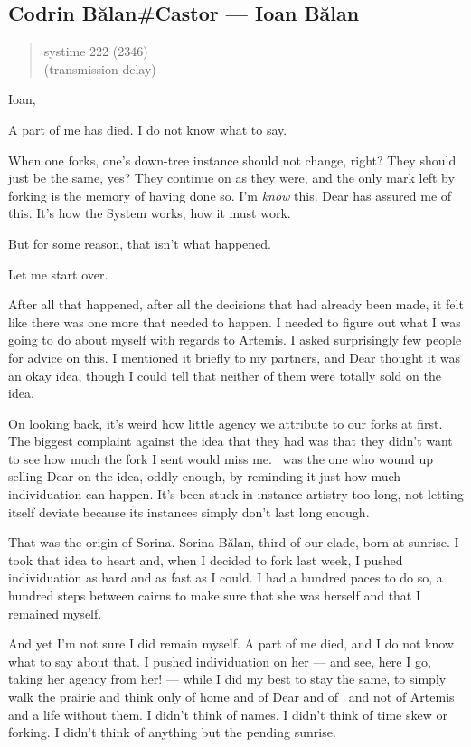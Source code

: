 \hypertarget{codrin-bux103lancastor-ioan-bux103lan}{%
\subsection{Codrin Bălan\#Castor — Ioan Bălan}\label{codrin-bux103lancastor-ioan-bux103lan}}

\begin{quote}
systime 222 (2346)\\
(transmission delay)
\end{quote}

Ioan,

A part of me has died. I do not know what to say.

When one forks, one's down-tree instance should not change, right? They should just be the same, yes? They continue on as they were, and the only mark left by forking is the memory of having done so. I'm \emph{know} this. Dear has assured me of this. It's how the System works, how it must work.

But for some reason, that isn't what happened.

Let me start over.

After all that happened, after all the decisions that had already been made, it felt like there was one more that needed to happen. I needed to figure out what I was going to do about myself with regards to Artemis. I asked surprisingly few people for advice on this. I mentioned it briefly to my partners, and Dear thought it was an okay idea, though I could tell that neither of them were totally sold on the idea.

On looking back, it's weird how little agency we attribute to our forks at first. The biggest complaint against the idea that they had was that they didn't want to see how much the fork I sent would miss me. \Partner\ was the one who wound up selling Dear on the idea, oddly enough, by reminding it just how much individuation can happen. It's been stuck in instance artistry too long, not letting itself deviate because its instances simply don't last long enough.

That was the origin of Sorina. Sorina Bălan, third of our clade, born at sunrise. I took that idea to heart and, when I decided to fork last week, I pushed individuation as hard and as fast as I could. I had a hundred paces to do so, a hundred steps between cairns to make sure that she was herself and that I remained myself.

And yet I'm not sure I did remain myself. A part of me died, and I do not know what to say about that. I pushed individuation on her — and see, here I go, taking her agency from her! — while I did my best to stay the same, to simply walk the prairie and think only of home and of Dear and of \Partner\ and not of Artemis and a life without them. I didn't think of names. I didn't think of time skew or forking. I didn't think of anything but the pending sunrise.

